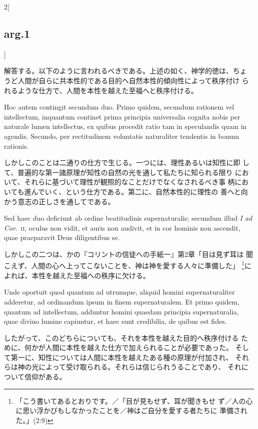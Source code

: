 \documentclass[paper=a4paper,fontsize=10pt,jafontsize=9pt,titlepage]{jlreq}
\begin{document}
\begin{paracol}{2}[\subsection{arg.1}]
\switchcolumn

解答する。以下のように言われるべきである。上述の如く、神学的徳は、ちょ
 うど人間が自らに共本性的である目的へ自然本性的傾向性によって秩序付け
 られるような仕方で、人間を本性を越えた至福へと秩序付ける。

\switchcolumn*

Hoc autem contingit secundum duo. Primo quidem, secundum rationem vel
intellectum, inquantum continet prima principia universalia cognita
nobis per naturale lumen intellectus, ex quibus procedit ratio tam in
speculandis quam in agendis. Secundo, per rectitudinem voluntatis
naturaliter tendentis in bonum rationis.

\switchcolumn

しかしこのことは二通りの仕方で生じる。一つには、理性あるいは知性に即
 して、普遍的な第一諸原理が知性の自然の光を通して私たちに知られる限り
 において、それらに基づいて理性が観照的なことだけでなくなされるべき事
 柄においても進んでいく、という仕方である。第二に、自然本性的に理性の
 善へと向かう意志の正しさを通してである。

\switchcolumn*

Sed haec duo deficiunt ab ordine beatitudinis supernaturalis; secundum
illud {\itshape I ad Cor}.~{\scshape ii}, oculus non vidit, et auris
non audivit, et in cor hominis non ascendit, quae praeparavit Deus
diligentibus se.

\switchcolumn

しかしこの二つは、かの『コリントの信徒への手紙一』第2章「目は見ず耳は
 聞こえず、人間の心へ上ってこないことを、神は神を愛する人々に準備した」
 \footnote{「こう書いてあるとおりです。／「目が見もせず、耳が聞きもせ
 ず／人の心に思い浮かびもしなかったことを／神はご自分を愛する者たちに
 準備された。」(2:9)}によれば、本性を越えた至福への秩序に欠ける。

\switchcolumn*

Unde oportuit quod quantum ad utrumque, aliquid homini
supernaturaliter adderetur, ad ordinandum ipsum in finem
supernaturalem. Et primo quidem, quantum ad intellectum, adduntur
homini quaedam principia supernaturalia, quae divino lumine capiuntur,
et haec sunt credibilia, de quibus est fides.

\switchcolumn

したがって、このどちらについても、それを本性を越えた目的へ秩序付ける
 ために、何かが人間に本性を越えた仕方で加えられることが必要であった。
 そして第一に、知性については人間に本性を越えたある種の原理が付加され、
 それらは神の光によって受け取られる。それらは信じられうることであり、
 それについて信仰がある。


\end{paracol}
\end{document}
